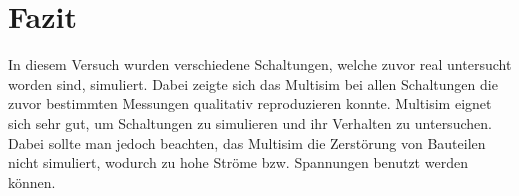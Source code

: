 \documentclass[12pt,a4paper]{article}
\begin{document}
\section{Fazit}

In diesem Versuch wurden verschiedene Schaltungen, welche zuvor real untersucht worden sind, simuliert. Dabei zeigte sich das Multisim bei allen Schaltungen die zuvor bestimmten Messungen qualitativ reproduzieren konnte. Multisim eignet sich sehr gut, um Schaltungen zu simulieren und ihr Verhalten zu untersuchen. Dabei sollte man jedoch beachten, das Multisim die Zerstörung von Bauteilen nicht simuliert, wodurch zu hohe Ströme bzw. Spannungen benutzt werden können.
\end{document}
